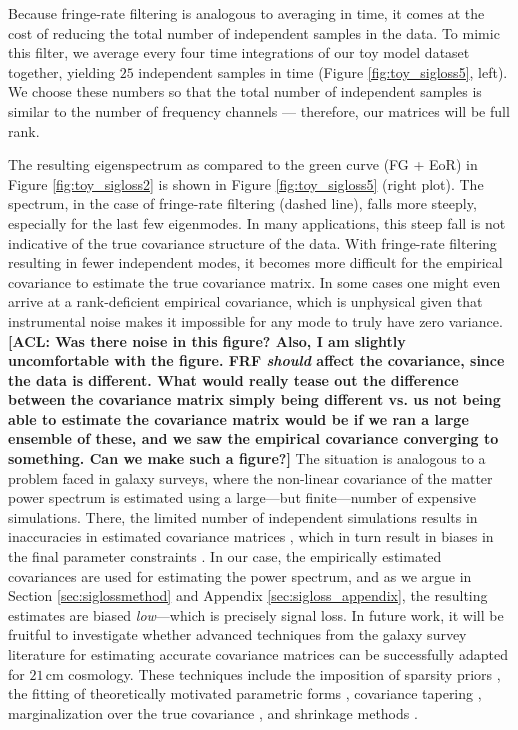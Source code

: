 \documentclass[preprint2,numberedappendix,tighten]{aastex6}  %
\newcommand{\cc}[1]{{\color{purple} \textbf{[CC: #1]}}}
\newcommand{\acl}[1]{{\color{red} \textbf{[ACL:  #1]}}}
\begin{document}
Because fringe-rate filtering is analogous to averaging in time, it comes at the cost of reducing the total number of independent 
samples in the data. To mimic this filter, we average every four time integrations of our toy model dataset together, yielding 
$25$ independent samples in time (Figure \ref{fig:toy_sigloss5}, left). We choose these numbers so that the total number of 
independent samples is similar to the number of frequency channels --- therefore, our matrices will be full rank.

The resulting eigenspectrum as compared to the green curve (FG + EoR) in Figure \ref{fig:toy_sigloss2} is shown in Figure 
\ref{fig:toy_sigloss5} (right plot). The spectrum, in the case of fringe-rate filtering (dashed line), falls more steeply, especially for 
the last few eigenmodes. In many applications, this steep fall is not indicative of the true covariance structure of the data. With 
fringe-rate filtering resulting in fewer independent modes, it becomes more difficult for the empirical covariance to estimate the 
true covariance matrix. In some cases one might even arrive at a rank-deficient empirical covariance, which is unphysical given 
that instrumental noise makes it impossible for any mode to truly have zero variance. \acl{Was there noise in this figure? Also, I 
am slightly uncomfortable with the figure. FRF \emph{should} affect the covariance, since the data is different. What would 
really tease out the difference between the covariance matrix simply being different vs. us not being able to estimate the 
covariance matrix would be if we ran a large ensemble of these, and we saw the empirical covariance converging to something. 
Can we make such a figure?} The situation is analogous to a problem faced in galaxy surveys, where the non-linear covariance 
of the matter power spectrum is estimated using a large---but finite---number of expensive simulations. There, the limited 
number of independent simulations results in inaccuracies in estimated covariance matrices 
\citep{dodelson_schneider2013,taylor_joachimi_etal2014}, which in turn result in biases in the final parameter constraints 
\citep{hartlap_et_al2007}. In our case, the empirically estimated covariances are used for estimating the power spectrum, and 
as we argue in Section \ref{sec:siglossmethod} and Appendix \ref{sec:sigloss_appendix}, the resulting estimates are biased 
\emph{low}---which is precisely signal loss. In future work, it will be fruitful to investigate whether advanced techniques from the 
galaxy survey literature for estimating accurate covariance matrices can be successfully adapted for $21\,\textrm{cm}$ 
cosmology. These techniques include the imposition of sparsity priors \citep{padmanabhan_et_al2016}, the fitting of 
theoretically motivated parametric forms \citep{pearson_samushia2016}, covariance tapering \citep{paz_sanchez2015}, 
marginalization over the true covariance \citep{sellentin_heavens2016}, and shrinkage methods 
\citep{pope_szapudi2008,joachimi_2017}.
\end{document}
